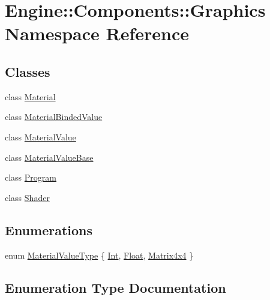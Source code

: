 \hypertarget{namespaceEngine_1_1Components_1_1Graphics}{}\section{Engine\+:\+:Components\+:\+:Graphics Namespace Reference}
\label{namespaceEngine_1_1Components_1_1Graphics}
\subsection*{Classes}
\begin{DoxyCompactItemize}
\item 
class \mbox{\hyperlink{classEngine_1_1Components_1_1Graphics_1_1Material}{Material}}
\item 
class \mbox{\hyperlink{classEngine_1_1Components_1_1Graphics_1_1MaterialBindedValue}{Material\+Binded\+Value}}
\item 
class \mbox{\hyperlink{classEngine_1_1Components_1_1Graphics_1_1MaterialValue}{Material\+Value}}
\item 
class \mbox{\hyperlink{classEngine_1_1Components_1_1Graphics_1_1MaterialValueBase}{Material\+Value\+Base}}
\item 
class \mbox{\hyperlink{classEngine_1_1Components_1_1Graphics_1_1Program}{Program}}
\item 
class \mbox{\hyperlink{classEngine_1_1Components_1_1Graphics_1_1Shader}{Shader}}
\end{DoxyCompactItemize}
\subsection*{Enumerations}
\begin{DoxyCompactItemize}
\item 
enum \mbox{\hyperlink{namespaceEngine_1_1Components_1_1Graphics_a44f5a2b57ee82aed849896c8311e403b}{Material\+Value\+Type}} \{ \mbox{\hyperlink{namespaceEngine_1_1Components_1_1Graphics_a44f5a2b57ee82aed849896c8311e403ba97d63336b89a741ffe735bc436147cc6}{Int}}, 
\mbox{\hyperlink{namespaceEngine_1_1Components_1_1Graphics_a44f5a2b57ee82aed849896c8311e403bafe29186f6aeccd144f81352b67ea9c51}{Float}}, 
\mbox{\hyperlink{namespaceEngine_1_1Components_1_1Graphics_a44f5a2b57ee82aed849896c8311e403babbf41bb0de18f4e8481bfb1372a99767}{Matrix4x4}}
 \}
\end{DoxyCompactItemize}


\subsection{Enumeration Type Documentation}
\mbox{\label{namespaceEngine_1_1Components_1_1Graphics_a44f5a2b57ee82aed849896c8311e403b}} 

